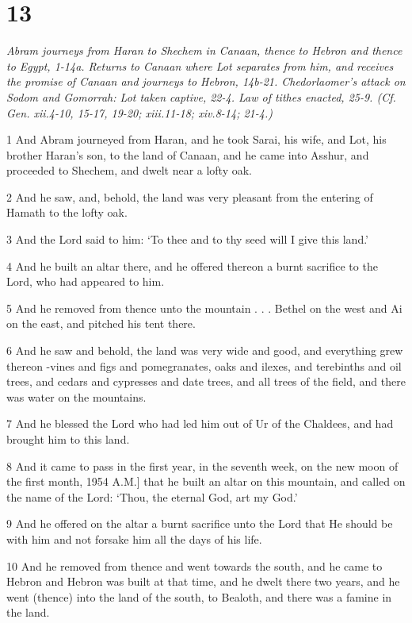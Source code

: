 \chapter{13}

\par \textit{Abram journeys from Haran to Shechem in Canaan, thence to Hebron and thence to Egypt, 1-14a. Returns to Canaan where Lot separates from him, and receives the promise of Canaan and journeys to Hebron, 14b-21. Chedorlaomer's attack on Sodom and Gomorrah: Lot taken captive, 22-4. Law of tithes enacted, 25-9. (Cf. Gen. xii.4-10, 15-17, 19-20; xiii.11-18; xiv.8-14; 21-4.)}

\par 1 And Abram journeyed from Haran, and he took Sarai, his wife, and Lot, his brother Haran's son, to the land of Canaan, and he came into Asshur, and proceeded to Shechem, and dwelt near a lofty oak.
\par 2 And he saw, and, behold, the land was very pleasant from the entering of Hamath to the lofty oak.
\par 3 And the Lord said to him: ‘To thee and to thy seed will I give this land.’
\par 4 And he built an altar there, and he offered thereon a burnt sacrifice to the Lord, who had appeared to him.
\par 5 And he removed from thence unto the mountain . . . Bethel on the west and Ai on the east, and pitched his tent there.
\par 6 And he saw and behold, the land was very wide and good, and everything grew thereon -vines and figs and pomegranates, oaks and ilexes, and terebinths and oil trees, and cedars and cypresses and date trees, and all trees of the field, and there was water on the mountains.
\par 7 And he blessed the Lord who had led him out of Ur of the Chaldees, and had brought him to this land.
\par 8 And it came to pass in the first year, in the seventh week, on the new moon of the first month, 1954 A.M.] that he built an altar on this mountain, and called on the name of the Lord: ‘Thou, the eternal God, art my God.’
\par 9 And he offered on the altar a burnt sacrifice unto the Lord that He should be with him and not forsake him all the days of his life.
\par 10 And he removed from thence and went towards the south, and he came to Hebron and Hebron was built at that time, and he dwelt there two years, and he went (thence) into the land of the south, to Bealoth, and there was a famine in the land.
